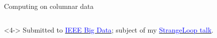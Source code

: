 \documentclass{beamer}
\begin{document}
\begin{frame}[fragile]{Computing on columnar data}
\begin{uncoverenv}
\begin{columns}[b]
\end{columns}
\end{uncoverenv}

\vspace{0.35 cm}
\begin{uncoverenv}<4->
Submitted to \href{http://cci.drexel.edu/bigdata/bigdata2017/index.html}{\textcolor{blue}{IEEE Big Data}}; subject of my \href{https://thestrangeloop.com/2017/particle-physics-10-000-times-faster.html}{\textcolor{blue}{StrangeLoop talk}}.
\end{uncoverenv}
\end{frame}
\end{document}
